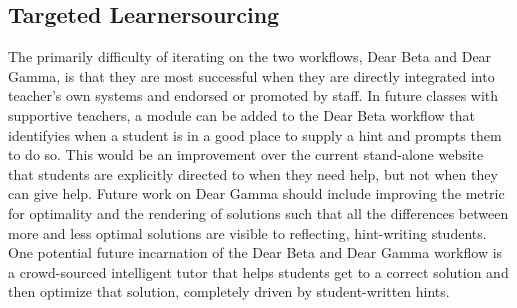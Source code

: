 \subsection{Targeted Learnersourcing}

The primarily difficulty of iterating on the two workflows, Dear Beta and Dear Gamma, is that they are most successful when they are directly integrated into teacher's own systems and endorsed or promoted by staff. In future classes with supportive teachers, a module can be added to the Dear Beta workflow that identifyies when a student is in a good place to supply a hint and prompts them to do so. This would be an improvement over the current stand-alone website that students are explicitly directed to when they need help, but not when they can give help. Future work on Dear Gamma should include improving the metric for optimality and the rendering of solutions such that all the differences between more and less optimal solutions are visible to reflecting, hint-writing students. One potential future incarnation of the Dear Beta and Dear Gamma workflow is a crowd-sourced intelligent tutor that helps students get to a correct solution and then optimize that solution, completely driven by student-written hints. %










